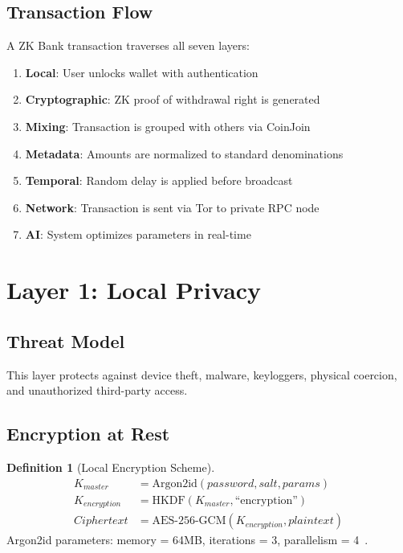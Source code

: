 \documentclass[11pt]{article}
\theoremstyle{definition}
\newtheorem{definition}{Definition}[section]
\theoremstyle{plain}
\theoremstyle{remark}
\begin{document}
\subsection{Transaction Flow}

A ZK Bank transaction traverses all seven layers:

\begin{enumerate}
    \item \textbf{Local}: User unlocks wallet with authentication
    \item \textbf{Cryptographic}: ZK proof of withdrawal right is generated
    \item \textbf{Mixing}: Transaction is grouped with others via CoinJoin
    \item \textbf{Metadata}: Amounts are normalized to standard denominations
    \item \textbf{Temporal}: Random delay is applied before broadcast
    \item \textbf{Network}: Transaction is sent via Tor to private RPC node
    \item \textbf{AI}: System optimizes parameters in real-time
\end{enumerate}

\section{Layer 1: Local Privacy}
\label{sec:layer1}

\subsection{Threat Model}

This layer protects against device theft, malware, keyloggers, physical coercion, and unauthorized third-party access.

\subsection{Encryption at Rest}

\begin{definition}[Local Encryption Scheme]
\begin{align}
K_{master} &= \text{Argon2id}(password, salt, params) \\
K_{encryption} &= \text{HKDF}(K_{master}, \text{``encryption''}) \\
Ciphertext &= \text{AES-256-GCM}(K_{encryption}, plaintext)
\end{align}
Argon2id parameters: memory = 64MB, iterations = 3, parallelism = 4~\cite{biryukov2016argon2}.
\end{definition}
\end{document}
